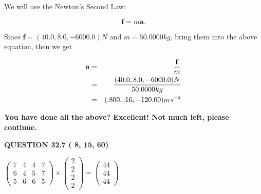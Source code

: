 \documentclass[12pt]{article}
\begin{document}
We will use the Newton's Second Law:
 
\[
\mathbf{f}=m\mathbf{a}.
\]
 
Since $\mathbf{f}= %
(40.0 , 8.0 , -6000.0) N$
and $m= %
50.0000kg$, bring them into the above equation, then we get
 
\begin{eqnarray*}
\mathbf{a}&=&\frac{\mathbf{f}}m  \\
&=&\frac{ %
(40.0 , 8.0 , -6000.0) N}{ %
50.0000kg}  \\
&=& %
(.800 , .16 , -120.00) ms^{-2}
\end{eqnarray*}
 
 
 
   
   
\vspace{0.3in}
{\textbf{\LARGE{You have done all the above? Excellent! Not much left, please continue.}}}
\vspace{0.3in}
   
   
  
\vspace{0.2in}
  
{\textbf{\Large{QUESTION
32.7 
 (          8,         15,         60)
}}}
  
  
 
 
\noindent{}

 
$\left( \begin{array}{ccccccccccccccc}
           7 & 
           4 & 
           4 & 
           7 \\ 
           6 & 
           4 & 
           5 & 
           7 \\ 
           5 & 
           6 & 
           6 & 
           5
\end{array}\right) \times
\left( \begin{array}{c}
           2 \\ 
           2 \\ 
           2 \\ 
           2
\end{array}\right)  =
\left( \begin{array}{c}
          44 \\ 
          44 \\ 
          44
\end{array}\right)  $
 
\end{document}
